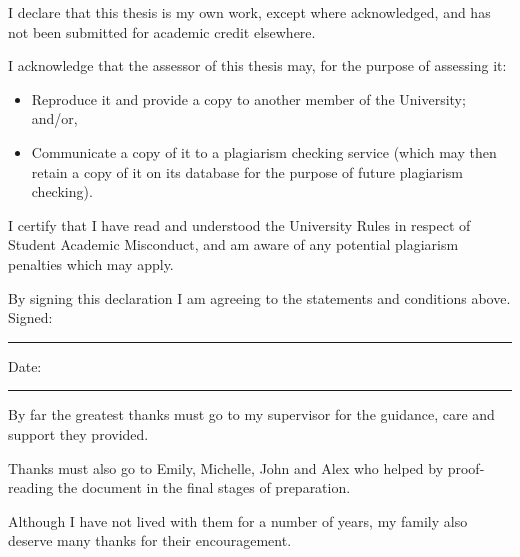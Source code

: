 \documentclass[honours,12pt,twoside]{unswthesis}
\newcommand\blankpage{%
    \null
    \thispagestyle{empty}%
    \addtocounter{page}{-1}%
    \newpage}
\numberwithin{equation}{section}
\begin{document}
\title{\RMarkdownTitle}

\author{\Authornameonly\\{\bigskip}\Supervisorname}


\copyrightfalse
\figurespagefalse
\tablespagefalse

\beforepreface

\afterpage{\blankpage}


\vskip 10pc \noindent I declare that this thesis is my
own work, except where acknowledged, and has not been submitted for
academic credit elsewhere.

\vskip 2pc \noindent I acknowledge that the assessor of this
thesis may, for the purpose of assessing it:

\begin{itemize}
\item Reproduce it and provide a copy to another member of the University; and/or,
\item Communicate a copy of it to a plagiarism checking service (which may then retain a copy of it on its database for the purpose of future plagiarism checking).
\end{itemize}

\vskip 2pc \noindent I certify that I have read and understood the University Rules in
respect of Student Academic Misconduct, and am aware of any potential plagiarism penalties which may
apply.\vspace{24pt}

\vskip 2pc \noindent By signing
this declaration I am
agreeing to the statements and conditions above.
\vskip 2pc \noindent
Signed: \rule{7cm}{0.25pt} \hfill Date: \rule{4cm}{0.25pt} \newline
\vskip 1pc

\blankpage


\bigskip By far the greatest thanks must go to my supervisor for
the guidance, care and support they provided.

\bigskip\noindent Thanks
must also go to Emily, Michelle, John and Alex who helped by
proof-reading the document in the final stages of preparation.

\bigskip\noindent Although
I have not lived with them for a number of years, my family also deserve
many thanks for their encouragement.
\end{document}
